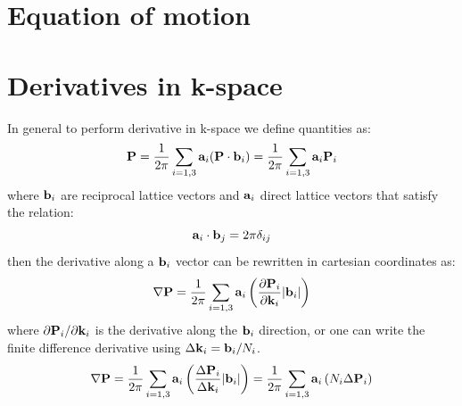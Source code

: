 \documentclass[preprint,showpacs,prb,superscriptaddress,aps,floatfix]{revtex4-1}
\newcommand{\ab}{{\bf a}}
\newcommand{\bb}{{\bf b}}
\newcommand{\PP}{{\bf P}}
\newcommand{\kk}{{\bf k}}
\newcommand{\be}{\begin{equation}}
\newcommand{\ee}{\end{equation}}
\renewcommand{\[}{\left[}
\renewcommand{\]}{\right]}
\renewcommand{\(}{\left(}
\renewcommand{\)}{\right)}
\begin{document}
\section{Equation of motion}

\appendix
\section{Derivatives in k-space}
In general to perform derivative in k-space we define quantities as:
\be
\PP = \frac{1}{2\pi} \sum_{i=1,3} \ab_i (\PP \cdot \bb_i) = \frac{1}{2\pi} \sum_{i=1,3} \ab_i \PP_i
\ee
where $\bb_i$ are reciprocal lattice vectors and $\ab_i$ direct lattice vectors that satisfy the relation:
\be
\ab_i \cdot \bb_j = 2\pi\delta_{ij}
\ee
then the derivative along a $\bb_i$ vector can be rewritten in cartesian coordinates as:
\be
\nabla \PP = \frac{1}{2\pi} \sum_{i=1,3} \ab_i \left( \frac{\partial \PP_i}{\partial \kk_i} |\bb_i| \right)
\ee 
where $\partial \PP_i/\partial \kk_i$ is the derivative along the $\bb_i$ direction, or one can write the finite difference derivative using $\Delta \kk_i = \bb_i/N_i$.
\be
\nabla \PP = \frac{1}{2\pi} \sum_{i=1,3} \ab_i \left( \frac{\Delta \PP_i}{\Delta \kk_i}  |\bb_i|  \right) = \frac{1}{2\pi} \sum_{i=1,3} \ab_i \left( N_i \Delta \PP_i \right)
\ee 



\end{document}
